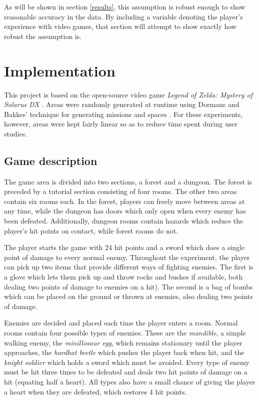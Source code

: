 \documentclass[a4paper]{article}
\begin{document}
\begin{multicols*}{2}
As will be shown in section \ref{results}, this assumption is robust enough to show reasonable accuracy in the data. By including a variable denoting the player's experience with video games, that section will attempt to show exactly how robust the assumption is.

\section{Implementation}
This project is based on the open-source video game \emph{Legend of Zelda: Mystery of Solarus DX} \cite{zeldasolarus}. Areas were randomly generated at runtime using Dormans and Bakkes' technique for generating missions and spaces \cite{missiongrammar}. For these experiments, however, areas were kept fairly linear so as to reduce time spent during user studies. 

\subsection{Game description}
The game area is divided into two sections, a forest and a dungeon. The forest is preceded by a tutorial section consisting of four rooms. The other two areas contain six rooms each. In the forest, players can freely move between areas at any time, while the dungeon has doors which only open when every enemy has been defeated. Additionally, dungeon rooms contain hazards which reduce the player's hit points on contact, while forest rooms do not.

The player starts the game with 24 hit points and a sword which does a single point of damage to every normal enemy. Throughout the experiment, the player can pick up two items that provide different ways of fighting enemies. The first is a glove which lets them pick up and throw rocks and bushes if available, both dealing two points of damage to enemies on a hit). The second is a bag of bombs which can be placed on the ground or thrown at enemies, also dealing two points of damage. 

Enemies are decided and placed each time the player enters a room. Normal rooms contain four possible types of enemies. These are the \emph{mandible}, a simple walking enemy, the \emph{minillosaur egg}, which remains stationary until the player approaches, the \emph{hardhat beetle} which pushes the player back when hit, and the \emph{knight soldier} which holds a sword which must be avoided. Every type of enemy must be hit three times to be defeated and deals two hit points of damage on a hit (equating half a heart). All types also have a small chance of giving the player a heart when they are defeated, which restores 4 hit points.


\end{multicols*}
\end{document}
